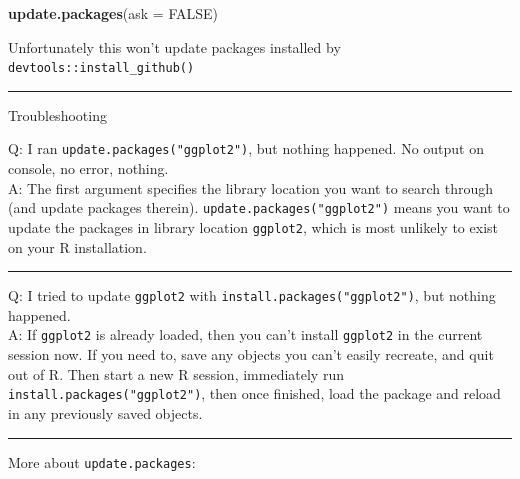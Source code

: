 \documentclass[
  a4paper,
  twoside,
  openright]{book}
\newenvironment{Shaded}{\begin{snugshade}}{\end{snugshade}}
\newcommand{\AttributeTok}[1]{\textcolor[rgb]{0.13,0.29,0.53}{#1}}
\newcommand{\ConstantTok}[1]{\textcolor[rgb]{0.56,0.35,0.01}{#1}}
\newcommand{\FunctionTok}[1]{\textcolor[rgb]{0.13,0.29,0.53}{\textbf{#1}}}
\newcommand{\NormalTok}[1]{#1}
\theoremstyle{definition}
\theoremstyle{definition}
\theoremstyle{definition}
\theoremstyle{definition}
\theoremstyle{remark}
\begin{document}
\begin{itemize}
\begin{Shaded}
\begin{Highlighting}[]
\FunctionTok{update.packages}\NormalTok{(}\AttributeTok{ask =} \ConstantTok{FALSE}\NormalTok{)}
\end{Highlighting}
\end{Shaded}

  Unfortunately this {won't} update packages installed by \texttt{devtools::install\_github()}
\end{itemize}

\begin{center}\rule{0.5\linewidth}{0.5pt}\end{center}

{Troubleshooting}

Q: I ran \texttt{update.packages("ggplot2")}, but nothing happened. No output on console, no error, nothing.\\
A: The first argument specifies the library location you want to search through (and update packages therein). \texttt{update.packages("ggplot2")} means you want to update the packages in library location \texttt{ggplot2}, which is most {unlikely} to exist on your R installation.

\begin{center}\rule{0.5\linewidth}{0.5pt}\end{center}

Q: I tried to update \texttt{ggplot2} with \texttt{install.packages("ggplot2")}, but nothing happened.\\
A: {If \texttt{ggplot2} is already loaded}, then you can't install \texttt{ggplot2} in the current session now. If you need to, save any objects you can't easily recreate, and quit out of R. Then start a new R session, immediately run \texttt{install.packages("ggplot2")}, then once finished, load the package and reload in any previously saved objects.

\begin{center}\rule{0.5\linewidth}{0.5pt}\end{center}

More about \texttt{update.packages}:
\end{document}
